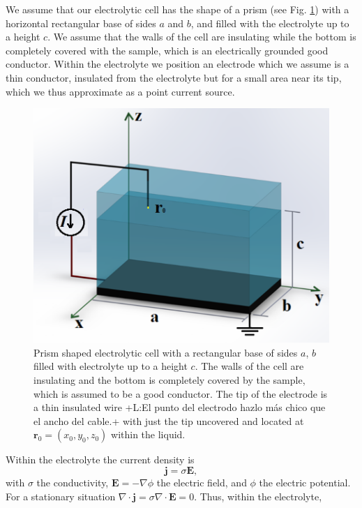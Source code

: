 \documentclass{article}
\newcommand{\notaL}[1]{{\color{blue}+L:#1+}}
\begin{document}
We assume that our electrolytic cell has the shape of a
prism (see Fig. \ref{f:celda}) with a horizontal rectangular base of sides $a$ and $b$, and
filled with the electrolyte up to a height $c$. We assume that the
walls of the cell are insulating while the bottom is completely
covered with the sample, which is an
electrically grounded good conductor. Within the electrolyte we position an electrode
which we assume is a thin conductor, insulated from the electrolyte
but for a small area near its tip, which we thus approximate as a
point current source.
\begin{figure}
  \centering
  \includegraphics[width=\textwidth]{Images/celdan1}
  \caption{Prism shaped electrolytic cell with a rectangular base of
    sides $a$, $b$ filled with electrolyte up to a height $c$. The
    walls of the cell are insulating and the bottom is completely
    covered by the sample, which is assumed to be a good
    conductor. The tip of the electrode is a thin insulated wire
    \notaL{El punto del electrodo hazlo más chico que el ancho
      del cable.} with just the tip uncovered and located at $\bm r_0=(x_0,y_0,z_0)$ within the
    liquid.}
  \label{f:celda}
\end{figure}
Within the electrolyte the current density is
\begin{equation}
  \label{eq:j}
  \bm j=\sigma\bm E,
\end{equation}
with
$\sigma$ the conductivity, $\bm E=-\nabla\phi$ the electric field,
and $\phi$ the electric potential. For a
stationary situation
$\nabla\cdot \bm j = \sigma\nabla\cdot\bm E=0$. Thus, within the electrolyte,
\end{document}
